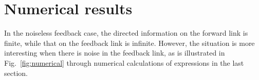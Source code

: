 \documentclass[conference]{IEEEtran}
\begin{document}


\section{Numerical results}
\label{sec:numerical-results}
In the noiseless feedback case, the directed information on the forward link is finite, while that on the feedback link is infinite. However, the situation is more interesting when there is noise in the feedback link, as is illustrated in Fig.~\ref{fig:numerical} through numerical calculations of expressions in the last section. 
\end{document}
